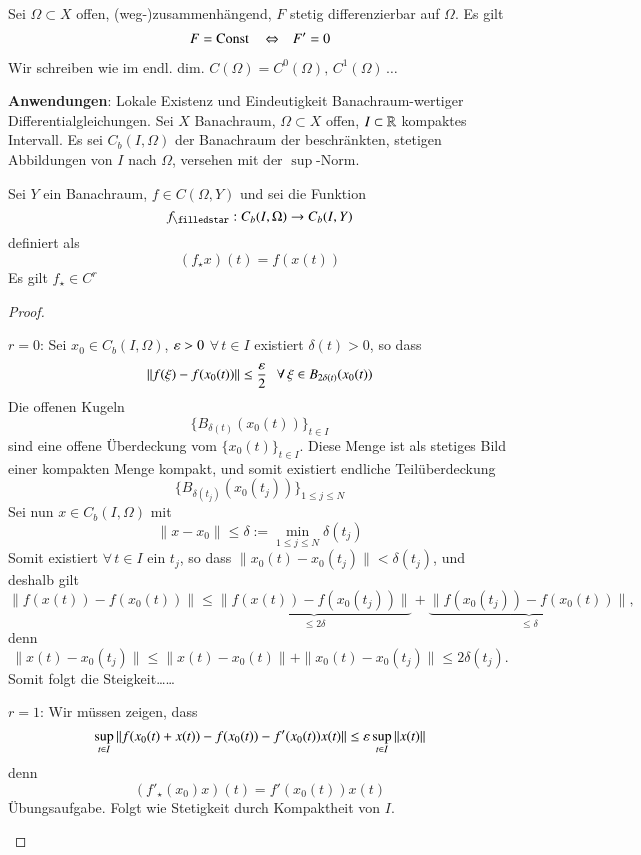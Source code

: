 \begin{cor}\label{1.16}
    Sei $\Omega \subset X$ offen, (weg-)zusammenhängend, $F$ stetig differenzierbar auf $\Omega$.
    Es gilt
    \[
        F= \mathrm{Const} \, \hspace{.25cm} \Leftrightarrow \hspace{.25cm} F'=0
    \]
\end{cor}
\begin{remark}
    Wir schreiben wie im endl. dim. $C(\Omega)= C^0(\Omega), \, C^1(\Omega)\, …$
\end{remark}

\noindent \textbf{Anwendungen}: Lokale Existenz und Eindeutigkeit Banachraum-wertiger
Differentialgleichungen. Sei $X$ Banachraum, $\Omega\subset X$ offen, $I\subset \mathbb{R}$
kompaktes Intervall. Es sei $C_b(I,\Omega)$ der Banachraum der beschränkten, stetigen Abbildungen
von $I$ nach $\Omega$, versehen mit der $\sup$-Norm.

\begin{lem}
    Sei $Y$ ein Banachraum, $f\in C(\Omega,Y)$ und sei die Funktion
    \[
        f_\star: C_b(I,\Omega)\ra C_b(I,Y)
    \]
    definiert als
    \[
        (f_\star x)(t)= f(x(t))
    \]
    Es gilt $f_\star\in C^r$
\end{lem}

\begin{proof}
    \begin{description}
    \item{$r=0$:}
    Sei $x_0\in C_b(I,\Omega)$, $\varepsilon>0$ $\forall \, t \in I$ existiert $\delta(t)>0$, so dass
    \[
        \|f(\xi)-f(x_0(t))\|\leq \frac{\varepsilon}{2} \hspace{.25cm} \forall \, \xi\in B_{2\delta(t)}(x_0(t))
    \]
    Die offenen Kugeln 
    \[
        \{ B_{\delta(t)}(x_0(t)) \}_{t\in I}
    \]
    sind eine offene Überdeckung vom $\{ x_0(t) \}_{t\in I}$. Diese Menge ist als stetiges Bild einer
    kompakten Menge kompakt, und somit existiert endliche Teilüberdeckung
    \[
        \{ B_{\delta(t_j)}(x_0(t_j)) \}_{1\leq j \leq N}
    \]
    Sei nun $x\in C_b(I,\Omega)$ mit
    \[
        \|x-x_0\|\leq \delta := \min_{1\leq j \leq N}\delta(t_j)
    \]
    Somit existiert $\forall \, t\in I$ ein $t_j$, so dass $\|x_0(t)-x_0(t_j)\|< \delta(t_j)$,
    und deshalb gilt
    \[
        \|f(x(t))- f(x_0(t))\|\leq \underbrace{\|f(x(t))-f(x_0(t_j))\|}_{\leq 2\delta}
        +\underbrace{\|f(x_0(t_j))-f(x_0(t))\|}_{\leq\delta},
    \]
    denn
    \[
        \|x(t)-x_0(t_j)\|\leq \|x(t)-x_0(t)\|+\|x_0(t)-x_0(t_j)\|\leq 2\delta(t_j).
    \]
    Somit folgt die Steigkeit……
    \item{$r=1$:}
    Wir müssen zeigen, dass
    \[
        \sup_{t\in I} \|f(x_0(t)+x(t))- f(x_0(t)) - f'(x_0(t))x(t)\|\leq \varepsilon \sup_{t\in I}\|x(t)\|
    \]
    denn
    \[
        (f'_\star(x_0)x)(t)= f'(x_0(t))x(t)
    \]
    Übungsaufgabe. Folgt wie Stetigkeit durch Kompaktheit von $I$.
    \end{description}
    \[  \]
\end{proof}
